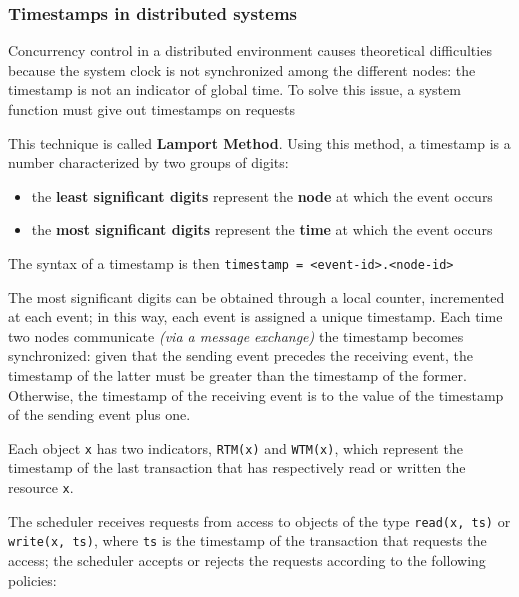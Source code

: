 \documentclass[english]{article}
\begin{document}
\subsubsection{Timestamps in distributed systems}

Concurrency control in a distributed environment causes theoretical difficulties because the system clock is not synchronized among the different nodes:
the timestamp is not an indicator of global time.
To solve this issue, a system function must give out timestamps on requests

This technique is called \textbf{Lamport Method}.
Using this method, a timestamp is a number characterized by two groups of digits:

\begin{itemize}
  \item the \textbf{least significant digits} represent the \textbf{node} at which the event occurs
  \item the \textbf{most significant digits} represent the \textbf{time} at which the event occurs
\end{itemize}

The syntax of a timestamp is then \texttt{timestamp = <event-id>.<node-id>}

\bigskip
The most significant digits can be obtained through a local counter, incremented at each event; in this way, each event is assigned a unique timestamp.
Each time two nodes communicate \textit{(via a message exchange)} the timestamp becomes synchronized: given that the sending event precedes the receiving event, the timestamp of the latter must be greater than the timestamp of the former.
Otherwise, the timestamp of the receiving event is  to the value of the timestamp of the sending event plus one.

\bigskip
Each object \texttt{x} has two indicators, \texttt{RTM(x)} and \texttt{WTM(x)}, which represent the timestamp of the last transaction that has respectively read or written the resource \texttt{x}.

The scheduler receives requests from access to objects of the type \texttt{read(x, ts)} or \texttt{write(x, ts)}, where \texttt{ts} is the timestamp of the transaction that requests the access; the scheduler accepts or rejects the requests according to the following policies:
\end{document}
